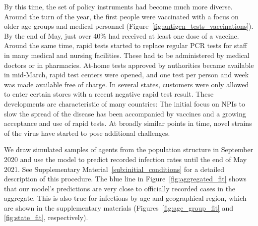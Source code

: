 \begin{figure}[!tp]
\end{figure}

By this time, the set of policy instruments had become much more diverse. Around the
turn of the year, the first people were vaccinated with a focus on older age groups and
medical personnel (Figure~\ref{fig:antigen_tests_vaccinations}). By the end of May, just
over 40\% had received at least one dose of a vaccine. Around the same time, rapid tests
started to replace regular PCR tests for staff in many medical and nursing facilities.
These had to be administered by medical doctors or in pharmacies. At-home tests approved
by authorities became available in mid-March, rapid test centers were opened, and one
test per person and week was made available free of charge. In several states, customers
were only allowed to enter certain stores with a recent negative rapid test result.
These developments are characteristic of many countries: The initial focus on NPIs to
slow the spread of the disease has been accompanied by vaccines and a growing acceptance
and use of rapid tests. At broadly similar points in time, novel strains of the virus
have started to pose additional challenges.

We draw simulated samples of agents from the population structure in September 2020 and
use the model to predict recorded infection rates until the end of May 2021. See
Supplementary Material~\ref{sub:initial_conditions} for a detailed description of this
procedure. The blue line in Figure~\ref{fig:aggregated_fit} shows that our model's
predictions are very close to officially recorded cases in the aggregate. This is also
true for infections by age and geographical region, which are shown in the supplementary
materials (Figures~\ref{fig:age_group_fit} and \ref{fig:state_fit}, respectively).


